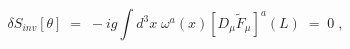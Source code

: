 \begin{equation}
\delta S_{inv}[\theta] \;=\; - i g \int d^3x \; \omega^a (x)
[D_\mu {\tilde F}_\mu ]^a(L) \;=\;0 \;,
\end{equation}

